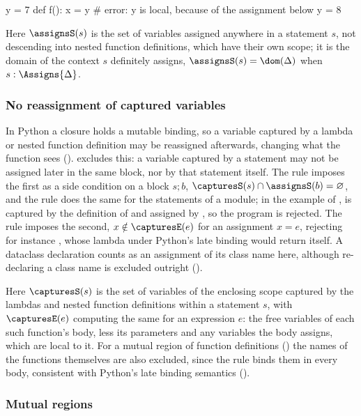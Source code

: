 \begin{python}
y = 7
def f():
    x = y  # error: y is local, because of the assignment below
    y = 8
\end{python}

\noindent Here $\assignsS(s)$ is the set of variables assigned anywhere in a statement $s$, not descending
into nested function definitions, which have their own scope; it is the domain of the context $s$
definitely assigns, $\assignsS(s) = \dom(\Delta)$ when $s : \Assigns{\Delta}$.

\subsubsection{No reassignment of captured variables}
\label{sec:captured-vars}

In Python a closure holds a mutable binding, so a variable captured by a lambda or nested function
definition may be reassigned afterwards, changing what the function sees ().
\PurePy excludes this: a variable captured by a statement may not be assigned later in the same block, nor
by that statement itself. The  rule imposes the first as a side condition on a block $s; b$,
$\capturesS(s) \cap \assignsS(b) = \varnothing$, and the  rule does the same for the
statements of a module; in the example of ,  is captured by the
definition of  and assigned by , so the program is rejected. The
 rule imposes the second, $x \notin \capturesE(e)$ for an assignment $x = e$, rejecting
for instance , whose lambda under Python's late binding would return itself. A
dataclass declaration counts as an assignment of its class name here, although re-declaring a class name is
excluded outright ().

Here $\capturesS(s)$ is the set of variables of the enclosing scope captured by the lambdas and nested
function definitions within a statement $s$, with $\capturesE(e)$ computing the same for an expression $e$: the
free variables of each such function's body, less its parameters and any variables the body assigns, which
are local to it. For a mutual region of function definitions () the names of the functions
themselves are also excluded, since the  rule binds them in every body, consistent with
Python's late binding semantics ().

\subsubsection{Mutual regions}
\label{sec:mutual-recursion}

